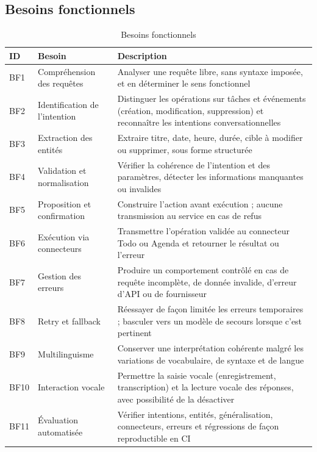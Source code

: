 \documentclass[11pt,a4paper,openany,oneside]{report}
\begin{document}
\subsection{Besoins fonctionnels}
\begin{table}[htbp]
\centering\small
\caption{Besoins fonctionnels}\label{tab:bf}
\begin{tabularx}{\textwidth}{@{}lp{3.6cm}X@{}}
\toprule
\textbf{ID} & \textbf{Besoin} & \textbf{Description} \\
\midrule
BF1 & Compréhension des requêtes & Analyser une requête libre, sans syntaxe imposée, et en déterminer le sens fonctionnel \\
BF2 & Identification de l'intention & Distinguer les opérations sur tâches et événements (création, modification, suppression) et reconnaître les intentions conversationnelles \\
BF3 & Extraction des entités & Extraire titre, date, heure, durée, cible à modifier ou supprimer, sous forme structurée \\
BF4 & Validation et normalisation & Vérifier la cohérence de l'intention et des paramètres, détecter les informations manquantes ou invalides \\
BF5 & Proposition et confirmation & Construire l'action avant exécution ; aucune transmission au service en cas de refus \\
BF6 & Exécution via connecteurs & Transmettre l'opération validée au connecteur Todo ou Agenda et retourner le résultat ou l'erreur \\
BF7 & Gestion des erreurs & Produire un comportement contrôlé en cas de requête incomplète, de donnée invalide, d'erreur d'API ou de fournisseur \\
BF8 & Retry et fallback & Réessayer de façon limitée les erreurs temporaires ; basculer vers un modèle de secours lorsque c'est pertinent \\
BF9 & Multilinguisme & Conserver une interprétation cohérente malgré les variations de vocabulaire, de syntaxe et de langue \\
BF10 & Interaction vocale & Permettre la saisie vocale (enregistrement, transcription) et la lecture vocale des réponses, avec possibilité de la désactiver \\
BF11 & Évaluation automatisée & Vérifier intentions, entités, généralisation, connecteurs, erreurs et régressions de façon reproductible en CI \\
\bottomrule
\end{tabularx}
\end{table}
\end{document}
